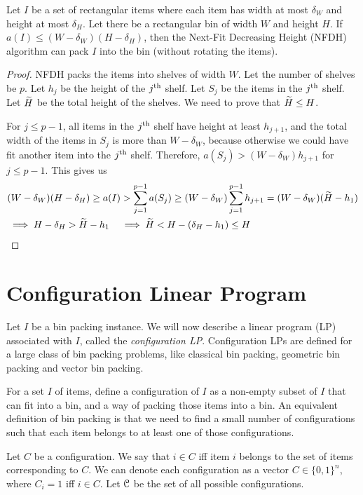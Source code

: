 \begin{lemma}
\label{thm:nfdh-small}
Let $I$ be a set of rectangular items where each item has width at most $\delta_W$
and height at most $\delta_H$. Let there be a rectangular bin of width $W$ and height $H$.
If $a(I) \le (W - \delta_W)(H - \delta_H)$, then the Next-Fit Decreasing Height (NFDH)
algorithm can pack $I$ into the bin (without rotating the items).
\end{lemma}
\begin{proof}
NFDH packs the items into shelves of width $W$.
Let the number of shelves be $p$.
Let $h_j$ be the height of the $j^{\textrm{th}}$ shelf.
Let $S_j$ be the items in the $j^{\textrm{th}}$ shelf.
Let $\widetilde{H}$ be the total height of the shelves.
We need to prove that $\widetilde{H} \le H$.

For $j \le p-1$, all items in the $j^{\textrm{th}}$ shelf have height at least $h_{j+1}$,
and the total width of the items in $S_j$ is more than $W-\delta_W$,
because otherwise we could have fit another item into the $j^{\textrm{th}}$ shelf.
Therefore, $a(S_j) > (W-\delta_W)h_{j+1}$ for $j \le p-1$. This gives us
\begin{align*}
& (W - \delta_W)(H - \delta_H) \ge a(I) > \sum_{j=1}^{p-1} a(S_j)
\ge (W-\delta_W)\sum_{j=1}^{p-1} h_{j+1}
= (W-\delta_W)(\widetilde{H} - h_1)
\\ &\implies H - \delta_H > \widetilde{H} - h_1
\quad\implies \widetilde{H} < H - (\delta_H - h_1) \le H
\qedhere \end{align*}
\end{proof}

\section{Configuration Linear Program}
\label{sec:config-lp}

Let $I$ be a bin packing instance.
We will now describe a linear program (LP) associated with $I$,
called the \emph{configuration LP}.
Configuration LPs are defined for a large class of bin packing problems,
like classical bin packing, geometric bin packing and vector bin packing.

For a set $I$ of items, define a configuration of $I$ as a non-empty subset of $I$
that can fit into a bin, and a way of packing those items into a bin.
An equivalent definition of bin packing is that we need to find
a small number of configurations such that each item belongs to
at least one of those configurations.

Let $C$ be a configuration. We say that $i \in C$ iff
item $i$ belongs to the set of items corresponding to $C$.
We can denote each configuration as a vector $C \in \{0, 1\}^n$,
where $C_i = 1$ iff $i \in C$.
Let $\mathcal{C}$ be the set of all possible configurations.


